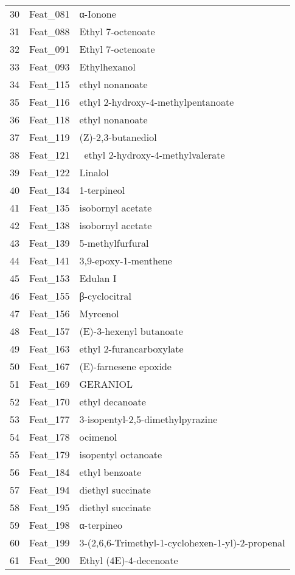 \begin{table}[ht]
\begin{tabular}{rll}
  30 & Feat\_081 & α-Ionone \\ 
  31 & Feat\_088 & Ethyl 7-octenoate \\ 
  32 & Feat\_091 & Ethyl 7-octenoate \\ 
  33 & Feat\_093 & Ethylhexanol \\ 
  34 & Feat\_115 & ethyl nonanoate \\ 
  35 & Feat\_116 & ethyl 2-hydroxy-4-methylpentanoate \\ 
  36 & Feat\_118 & ethyl nonanoate \\ 
  37 & Feat\_119 & (Z)-2,3-butanediol \\ 
  38 & Feat\_121 &  ethyl 2-hydroxy-4-methylvalerate \\ 
  39 & Feat\_122 & Linalol \\ 
  40 & Feat\_134 & 1-terpineol \\ 
  41 & Feat\_135 & isobornyl acetate \\ 
  42 & Feat\_138 & isobornyl acetate \\ 
  43 & Feat\_139 & 5-methylfurfural \\ 
  44 & Feat\_141 & 3,9-epoxy-1-menthene \\ 
  45 & Feat\_153 & Edulan I \\ 
  46 & Feat\_155 & β-cyclocitral \\ 
  47 & Feat\_156 & Myrcenol \\ 
  48 & Feat\_157 & (E)-3-hexenyl butanoate \\ 
  49 & Feat\_163 & ethyl 2-furancarboxylate  \\ 
  50 & Feat\_167 & (E)-farnesene epoxide \\ 
  51 & Feat\_169 & GERANIOL \\ 
  52 & Feat\_170 & ethyl decanoate \\ 
  53 & Feat\_177 & 3-isopentyl-2,5-dimethylpyrazine \\ 
  54 & Feat\_178 & ocimenol \\ 
  55 & Feat\_179 & isopentyl octanoate \\ 
  56 & Feat\_184 & ethyl benzoate \\ 
  57 & Feat\_194 & diethyl succinate \\ 
  58 & Feat\_195 & diethyl succinate \\ 
  59 & Feat\_198 & α-terpineo \\ 
  60 & Feat\_199 & 3-(2,6,6-Trimethyl-1-cyclohexen-1-yl)-2-propenal \\ 
  61 & Feat\_200 & Ethyl (4E)-4-decenoate \\ 

\end{tabular}
\end{table}
